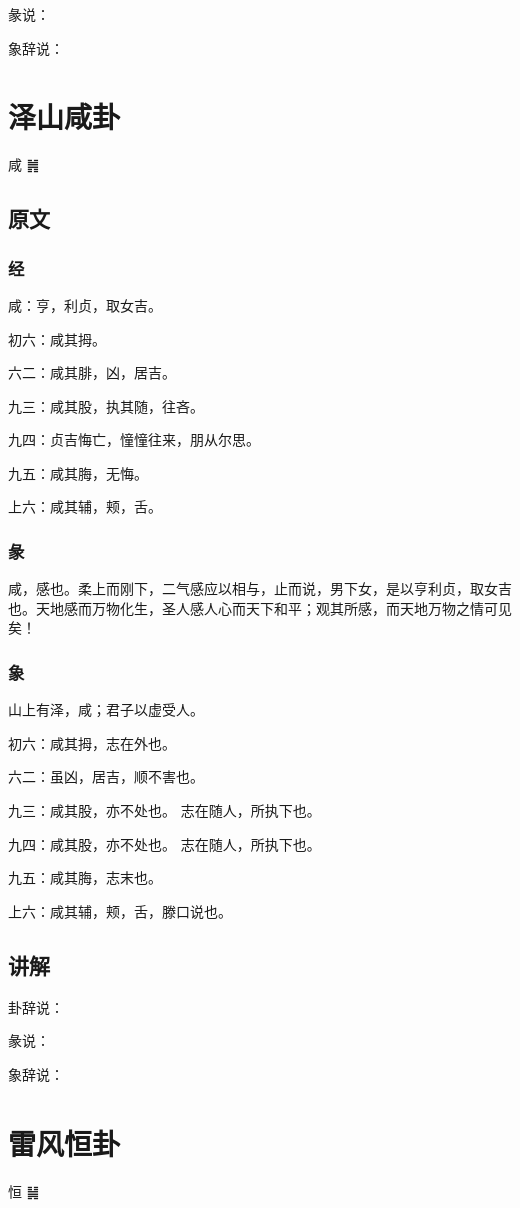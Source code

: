 \documentclass[12pt,oneside]{book}
\begin{document}
彖说：

象辞说：

\chapter{泽山咸卦}
咸 {\Large ䷞}

\section{原文}

\subsection{经}
咸：亨，利贞，取女吉。

初六：咸其拇。

六二：咸其腓，凶，居吉。

九三：咸其股，执其随，往吝。

九四：贞吉悔亡，憧憧往来，朋从尔思。

九五：咸其脢，无悔。

上六：咸其辅，颊，舌。

\subsection{彖}
咸，感也。柔上而刚下，二气感应以相与，止而说，男下女，是以亨利贞，取女吉也。天地感而万物化生，圣人感人心而天下和平；观其所感，而天地万物之情可见矣！

\subsection{象}
山上有泽，咸；君子以虚受人。

初六：咸其拇，志在外也。

六二：虽凶，居吉，顺不害也。

九三：咸其股，亦不处也。 志在随人，所执下也。

九四：咸其股，亦不处也。 志在随人，所执下也。

九五：咸其脢，志末也。

上六：咸其辅，颊，舌，滕口说也。

\section{讲解}
卦辞说：

彖说：

象辞说：

\chapter{雷风恒卦}
恒 {\Large ䷟}
\end{document}
